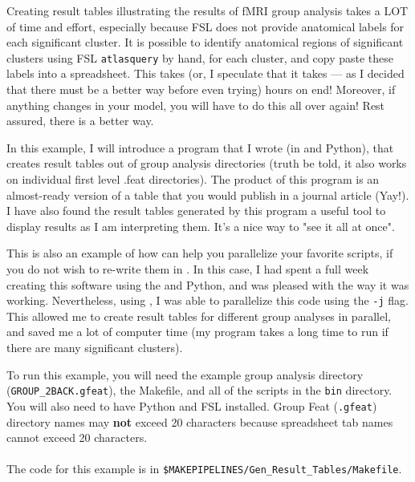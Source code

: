 
Creating result tables illustrating the results of fMRI group analysis takes a LOT of time and effort, especially because FSL does not provide anatomical labels for each significant cluster. It is possible to identify anatomical regions of significant clusters using FSL \texttt{atlasquery} by hand, for each cluster, and copy paste these labels into a spreadsheet. This takes (or, I speculate that it takes --- as I decided that there must be a better way before even trying) hours on end! Moreover, if anything changes in your model, you will have to do this all over again! Rest assured, there is a better way.

In this example, I will introduce a program that I wrote (in \bashn{} and Python), that  creates result tables out of group analysis directories (truth be told, it also works on individual first level .feat directories). The product of this program is an almost-ready version of a table that you would publish in a journal article (Yay!). I have also found the result tables generated by this program a useful tool to display results as I am interpreting them. It's a nice way to "see it all at once".

This is also an example of how \maken{} can help you parallelize your favorite scripts, if you do not wish to re-write them in \maken{}. In this case, I had spent a full week creating this software using the \bashn{} and Python, and was pleased with the way it was working. Nevertheless, using \maken{}, I was able to parallelize this code using the \texttt{-j} flag. This allowed me to create result tables for different group analyses in parallel, and saved me a lot of computer time (my program takes a long time to run if there are many significant clusters). 

To run this example, you will need the example group analysis directory (\texttt{GROUP_2BACK.gfeat}), the Makefile, and all of the scripts in the \texttt{bin} directory. You will also need to have Python and FSL installed. Group Feat (\texttt{.gfeat}) directory names may \textbf{not} exceed 20 characters because spreadsheet tab names cannot exceed 20 characters. 

\paragraph{}The code for this example is in \texttt{\$MAKEPIPELINES/Gen_Result_Tables/Makefile}.

